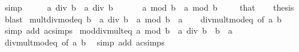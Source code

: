 \begin{isabellebody}
\ simp\isanewline
\ \ \isamarkupfalse%
\ \isamarkupfalse%
\ {\isachardoublequoteopen}a\ div\ b\ {\isacharequal}{\kern0pt}\ a\ div\ b{\isachardoublequoteclose}\ \isacommand{{\isachardot}{\kern0pt}{\isachardot}{\kern0pt}}\isamarkupfalse%
\isanewline
\ \ \isamarkupfalse%
\ \isamarkupfalse%
\ {\isachardoublequoteopen}a\ mod\ b\ {\isacharequal}{\kern0pt}\ a\ mod\ b{\isachardoublequoteclose}\ \isacommand{{\isachardot}{\kern0pt}{\isachardot}{\kern0pt}}\isamarkupfalse%
\isanewline
\ \ \isamarkupfalse%
\ that\ \isamarkupfalse%
\ \isamarkupfalse%
\ thesis\ \isamarkupfalse%
\ blast\isanewline
{}\isamarkupfalse%
%
\endisatagproof
{\isafoldproof}%
%
\isadelimproof
\isanewline
%
\endisadelimproof
\isanewline
{}\isamarkupfalse%
\ mult{\isacharunderscore}{\kern0pt}div{\isacharunderscore}{\kern0pt}mod{\isacharunderscore}{\kern0pt}eq{\isacharcolon}{\kern0pt}\ {\isachardoublequoteopen}b\ {\isacharasterisk}{\kern0pt}\ {\isacharparenleft}{\kern0pt}a\ div\ b{\isacharparenright}{\kern0pt}\ {\isacharplus}{\kern0pt}\ a\ mod\ b\ {\isacharequal}{\kern0pt}\ a{\isachardoublequoteclose}\isanewline
%
\isadelimproof
\ \ %
\endisadelimproof
%
\isatagproof
{}\isamarkupfalse%
\ div{\isacharunderscore}{\kern0pt}mult{\isacharunderscore}{\kern0pt}mod{\isacharunderscore}{\kern0pt}eq\ {\isacharbrackleft}{\kern0pt}of\ a\ b{\isacharbrackright}{\kern0pt}\ \isamarkupfalse%
\ {\isacharparenleft}{\kern0pt}simp\ add{\isacharcolon}{\kern0pt}\ ac{\isacharunderscore}{\kern0pt}simps{\isacharparenright}{\kern0pt}%
\endisatagproof
{\isafoldproof}%
%
\isadelimproof
\isanewline
%
\endisadelimproof
\isanewline
{}\isamarkupfalse%
\ mod{\isacharunderscore}{\kern0pt}div{\isacharunderscore}{\kern0pt}mult{\isacharunderscore}{\kern0pt}eq{\isacharcolon}{\kern0pt}\ {\isachardoublequoteopen}a\ mod\ b\ {\isacharplus}{\kern0pt}\ a\ div\ b\ {\isacharasterisk}{\kern0pt}\ b\ {\isacharequal}{\kern0pt}\ a{\isachardoublequoteclose}\isanewline
%
\isadelimproof
\ \ %
\endisadelimproof
%
\isatagproof
{}\isamarkupfalse%
\ div{\isacharunderscore}{\kern0pt}mult{\isacharunderscore}{\kern0pt}mod{\isacharunderscore}{\kern0pt}eq\ {\isacharbrackleft}{\kern0pt}of\ a\ b{\isacharbrackright}{\kern0pt}\ \isamarkupfalse%
\ {\isacharparenleft}{\kern0pt}simp\ add{\isacharcolon}{\kern0pt}\ ac{\isacharunderscore}{\kern0pt}simps{\isacharparenright}{\kern0pt}%
\endisatagproof
{\isafoldproof}%
%
\isadelimproof

\end{isabellebody}
